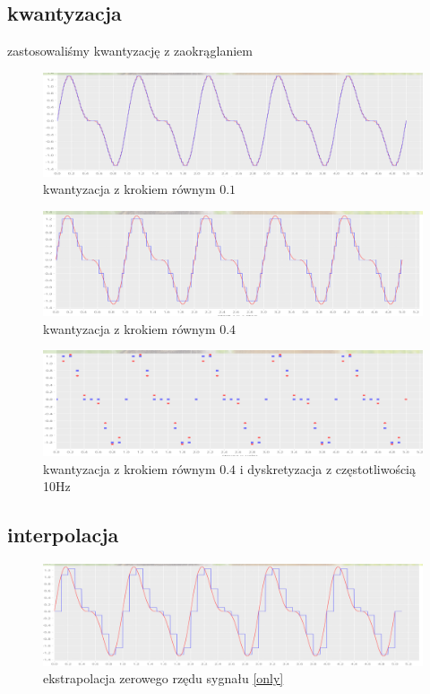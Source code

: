 \documentclass[12pt]{article}
\begin{document}
\subsection{kwantyzacja}
zastosowaliśmy kwantyzację z zaokrąglaniem


\begin{figure}[H]
	\includegraphics[width=\linewidth]{2akwant01.png}
	\caption{kwantyzacja z krokiem równym $0.1$}
\end{figure}


\begin{figure}[H]
	\includegraphics[width=\linewidth]{2akwant04.png}
	\caption{kwantyzacja z krokiem równym $0.4$}
\end{figure}

\begin{figure}[H]
	\includegraphics[width=\linewidth]{2aboth.png}
	\caption{kwantyzacja z krokiem równym $0.4$ i dyskretyzacja z częstotliwością 10Hz}
	\label{both}
\end{figure}


\subsection{interpolacja}

\begin{figure}[H]
	\includegraphics[width=\linewidth]{2z0.png}
	\caption{ekstrapolacja zerowego rzędu sygnału \ref{only}}
\end{figure}
\end{document}

